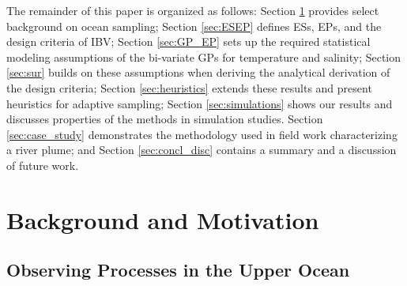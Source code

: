 \documentclass[aoas]{imsart}
\begin{document}
The remainder of this paper is organized as follows: Section
\ref{sec:bg} provides select background on ocean sampling; Section
\ref{sec:ESEP} defines ESs, EPs, and the design criteria of
IBV; Section \ref{sec:GP_EP} sets up the required statistical modeling
assumptions of the bi-variate GPs for temperature and
salinity; Section \ref{sec:sur} builds on these assumptions when deriving the analytical derivation of the design criteria; Section
\ref{sec:heuristics} extends these results and present heuristics for
adaptive sampling; Section \ref{sec:simulations} shows our results and
discusses properties of the methods in simulation studies. Section
\ref{sec:case_study} demonstrates the methodology used in field work
characterizing a river plume; and Section \ref{sec:concl_disc} contains a summary and a discussion of future work.


\section{Background and Motivation}\label{sec:bg}


\subsection{Observing Processes in the Upper Ocean}


\end{document}
